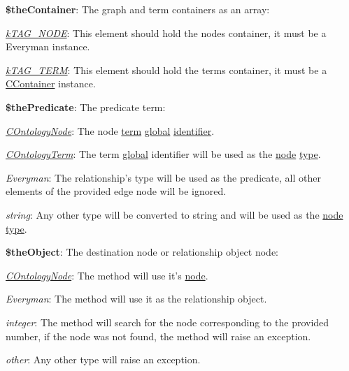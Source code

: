 \begin{DoxyItemize}
\item {\bfseries \$the\-Container}\-: The graph and term containers as an array\-: 
\begin{DoxyItemize}
\item {\itshape \hyperlink{}{k\-T\-A\-G\-\_\-\-N\-O\-D\-E}}\-: This element should hold the nodes container, it must be a Everyman instance. 
\item {\itshape \hyperlink{}{k\-T\-A\-G\-\_\-\-T\-E\-R\-M}}\-: This element should hold the terms container, it must be a \hyperlink{class_c_container}{C\-Container} instance. 
\end{DoxyItemize}
\item {\bfseries \$the\-Predicate}\-: The predicate term\-: 
\begin{DoxyItemize}
\item {\itshape \hyperlink{class_c_ontology_node}{C\-Ontology\-Node}}\-: The node \hyperlink{class_c_ontology_node_a2f294a9c93079f58190cedbdd0c09068}{term} \hyperlink{}{global} \hyperlink{class_c_ontology_term_object_ab1a4d21bb56a8a6cf3f77f595d776267}{identifier}. 
\item {\itshape \hyperlink{class_c_ontology_term}{C\-Ontology\-Term}}\-: The term \hyperlink{}{global} identifier will be used as the \hyperlink{class_c_ontology_edge}{node} \hyperlink{class_c_graph_edge_a584c0263fd773ffb764385a51d36caf2}{type}. 
\item {\itshape Everyman}\-: The relationship's type will be used as the predicate, all other elements of the provided edge node will be ignored. 
\item {\itshape string}\-: Any other type will be converted to string and will be used as the \hyperlink{class_c_ontology_edge}{node} \hyperlink{class_c_graph_edge_a584c0263fd773ffb764385a51d36caf2}{type}. 
\end{DoxyItemize}
\item {\bfseries \$the\-Object}\-: The destination node or relationship object node\-: 
\begin{DoxyItemize}
\item {\itshape \hyperlink{class_c_ontology_node}{C\-Ontology\-Node}}\-: The method will use it's \hyperlink{class_c_graph_node_ad830025d2d6650006eb6e737bd4f32c0}{node}. 
\item {\itshape Everyman}\-: The method will use it as the relationship object. 
\item {\itshape integer}\-: The method will search for the node corresponding to the provided number, if the node was not found, the method will raise an exception. 
\item {\itshape other}\-: Any other type will raise an exception. 
\end{DoxyItemize}
\end{DoxyItemize}

